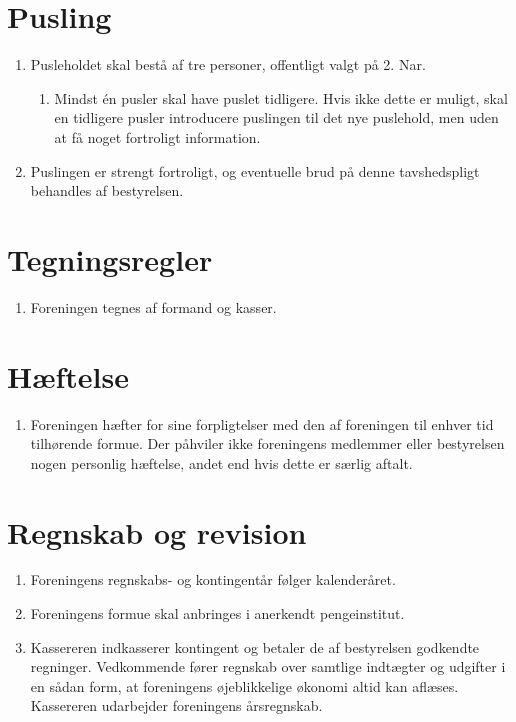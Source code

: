\documentclass[a4paper, 10pt]{article}
\renewcommand\thesection{\textsection\arabic{section}}
\newenvironment{stykenum}{
  \begin{enumerate}[%
    label=Stk.~\arabic*:, ref=\thesection~Stk.~\arabic{enumi}, start=1]
}{\end{enumerate}}
\newenvironment{substykenum}{
  \begin{enumerate}[%
          label=Stk.~\arabic{enumi}.\arabic*:,
      ref=\thesection~Stk.~\arabic{enumi}.\arabic*, start=1]
}{\end{enumerate}}
\begin{document}
\section{Pusling}
\begin{stykenum}
    \item Pusleholdet skal bestå af tre personer, offentligt valgt på 2. Nar.
        \begin{substykenum}
            \item Mindst én pusler skal have puslet tidligere. Hvis ikke dette
                er muligt, skal en tidligere pusler introducere puslingen til
                det nye puslehold, men uden at få noget fortroligt information.
        \end{substykenum}
    \item Puslingen er strengt fortroligt, og eventuelle brud på denne
        tavshedspligt behandles af bestyrelsen.
\end{stykenum}

\section{Tegningsregler}
\begin{stykenum}
    \item Foreningen tegnes af formand og kasser.
\end{stykenum}

\section{Hæftelse}
\begin{stykenum}
    \item Foreningen hæfter for sine forpligtelser med den af foreningen til
        enhver tid tilhørende formue. Der påhviler ikke foreningens medlemmer
        eller bestyrelsen nogen personlig hæftelse, andet end hvis dette er
        særlig aftalt.
\end{stykenum}

\section{Regnskab og revision}
\begin{stykenum}
    \item Foreningens regnskabs- og kontingentår følger kalenderåret.

    \item Foreningens formue skal anbringes i anerkendt pengeinstitut.

    \item Kassereren indkasserer kontingent og betaler de af bestyrelsen
        godkendte regninger. Vedkommende fører regnskab over samtlige indtægter
        og udgifter i en sådan form, at foreningens øjeblikkelige økonomi altid
        kan aflæses. Kassereren udarbejder foreningens årsregnskab.
\end{stykenum}
\end{document}
